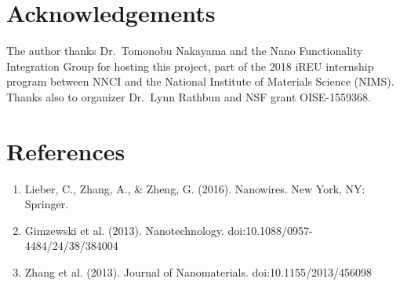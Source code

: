 \documentclass[twocolumn]{article}
\begin{document}
\section{Acknowledgements}

The author thanks Dr.\ Tomonobu Nakayama and the  Nano Functionality Integration Group for hosting this project, part of the 2018 iREU internship program between NNCI and the National Institute of Materials Science (NIMS). Thanks also to organizer Dr.\ Lynn Rathbun and NSF grant OISE-1559368.

\section{References}

\begin{enumerate}

\item Lieber, C., Zhang, A., \& Zheng, G. (2016). Nanowires. New York, NY: Springer.

\item Gimzewski et al. (2013). Nanotechnology. doi:10.1088/0957-4484/24/38/384004

\item Zhang et al. (2013). Journal of Nanomaterials. doi:10.1155/2013/456098

\end{enumerate}
\end{document}
